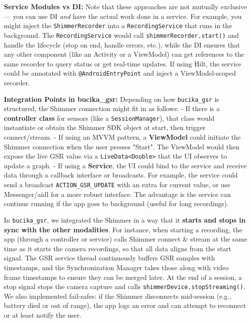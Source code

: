 {{\textbf{Service Modules vs DI:} Note that these approaches are not mutually
exclusive --- you can use DI \textit{and} have the actual work done in a
service. For example, you might inject the \texttt{ShimmerRecorder} into a
\texttt{RecordingService} that runs in the background. The \texttt{RecordingService}
would call \texttt{shimmerRecorder.start()} and handle the lifecycle (stop on
end, handle errors, etc.), while the DI ensures that any other component
(like an Activity or a ViewModel) can get references to the same
recorder to query status or get real-time updates. If using Hilt, the
service could be annotated with \texttt{@AndroidEntryPoint} and inject a
ViewModel-scoped recorder.

\textbf{Integration Points in bucika_gsr:} Depending on how \texttt{bucika_gsr} is
structured, the Shimmer connection might fit in as follows: - If there
is a \textbf{controller class} for sensors (like a \texttt{SessionManager}), that
class would instantiate or obtain the Shimmer SDK object at start, then
trigger connect/stream. - If using an MVVM pattern, a \textbf{ViewModel}
could initiate the Shimmer connection when the user presses "Start". The
ViewModel would then expose the live GSR value via a \texttt{LiveData<Double>}
that the UI observes to update a graph. - If using a \textbf{Service}, the UI
could bind to the service and receive data through a callback interface
or broadcasts. For example, the service could send a broadcast
\texttt{ACTION_GSR_UPDATE} with an extra for current value, or use
Messenger/aidl for a more robust interface. The advantage is the service
can continue running if the app goes to background (useful for long
recordings).

In \texttt{bucika_gsr}, we integrated the Shimmer in a way that it \textbf{starts and
stops in sync with the other modalities}. For instance, when starting a
recording, the app (through a controller or service) calls Shimmer
connect & stream at the same time as it starts the camera recordings, so
that all data aligns from the start
signal\cite{MainViewModel}\cite{MainViewModel}.
The GSR service thread continuously buffers GSR samples with timestamps,
and the Synchronization Manager takes those along with video frame
timestamps to ensure they can be merged later. At the end of a session,
a stop signal stops the camera capture and calls
\texttt{shimmerDevice.stopStreaming()}. We also implemented fail-safes: if the
Shimmer disconnects mid-session (e.g., battery died or out of range),
the app logs an error and can attempt to reconnect or at least notify
the user.

}}
